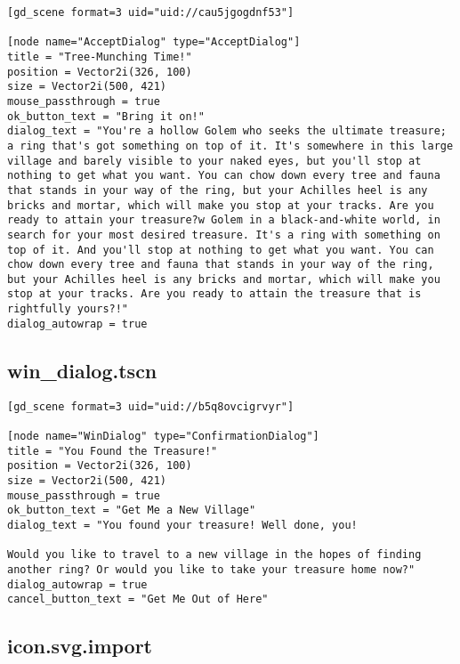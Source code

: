 \begin{lstlisting}
[gd_scene format=3 uid="uid://cau5jgogdnf53"]

[node name="AcceptDialog" type="AcceptDialog"]
title = "Tree-Munching Time!"
position = Vector2i(326, 100)
size = Vector2i(500, 421)
mouse_passthrough = true
ok_button_text = "Bring it on!"
dialog_text = "You're a hollow Golem who seeks the ultimate treasure; a ring that's got something on top of it. It's somewhere in this large village and barely visible to your naked eyes, but you'll stop at nothing to get what you want. You can chow down every tree and fauna that stands in your way of the ring, but your Achilles heel is any bricks and mortar, which will make you stop at your tracks. Are you ready to attain your treasure?w Golem in a black-and-white world, in search for your most desired treasure. It's a ring with something on top of it. And you'll stop at nothing to get what you want. You can chow down every tree and fauna that stands in your way of the ring, but your Achilles heel is any bricks and mortar, which will make you stop at your tracks. Are you ready to attain the treasure that is rightfully yours?!"
dialog_autowrap = true
\end{lstlisting}

\subsection{win\_dialog.tscn}

\begin{lstlisting}
[gd_scene format=3 uid="uid://b5q8ovcigrvyr"]

[node name="WinDialog" type="ConfirmationDialog"]
title = "You Found the Treasure!"
position = Vector2i(326, 100)
size = Vector2i(500, 421)
mouse_passthrough = true
ok_button_text = "Get Me a New Village"
dialog_text = "You found your treasure! Well done, you!

Would you like to travel to a new village in the hopes of finding another ring? Or would you like to take your treasure home now?"
dialog_autowrap = true
cancel_button_text = "Get Me Out of Here"
\end{lstlisting}

\subsection{icon.svg.import}

